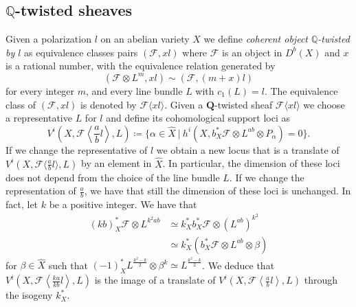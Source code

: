 \documentclass[11pt,letter]{amsart}
\numberwithin{equation}{section}
\begin{document}
\subsection{$\mathbb{Q}$-twisted sheaves}\label{sec2.2}
Given a polarization $l$ on an abelian variety $X$ we define \emph{coherent object $\mathbb{Q}$-twisted by $l$} as equivalence classes pairs $(\mathcal{F}, xl)$ where $\mathcal{F}$ is an object in $D^b(X)$ and $x$ is a rational number, with the equivalence relation generated by
$$
(\mathcal{F}\otimes L^m,xl)\sim(\mathcal{F},(m+x)l)
$$
for every integer $m$, and every line bundle $L$ with $c_1(L)=l$. The equivalence class of $(\mathcal{F},xl)$ is denoted by $\mathcal{F}\langle xl\rangle$. Given a $\mathbf{Q}$-twisted sheaf $\mathcal{F}\langle xl\rangle$ we choose a representative $L$ for $l$ and define its cohomological support loci as
$$
V^i\left(X, \mathcal{F}\left\langle \frac{a}{b}l\right\rangle, L\right)\coloneqq\{  \alpha\in\hat{X}\:|\:h^i(X, b_X^*\mathcal{F}\otimes L^{ab}\otimes P_  \alpha)=0\}.
$$
If we change the representative of $l$ we obtain a new locus that is a translate of $V^i\left(X, \mathcal{F}\langle \frac{a}{b}l\rangle, L\right)$ by an element in $\hat{X}$. In particular, the dimension of these loci does not depend from the choice of the line bundle $L$.
If we change the representation of $\frac{a}{b}$, we have that still the dimension of these loci is unchanged.
 In fact, let $k$ be a positive integer. We have that 
 \begin{align*}
  (k b)_X^*\mathcal{F}\otimes L^{k^2ab} &\simeq   k_X^*b_X^* \mathcal{F}\otimes\left( L^{ab}\right)^{k^2}\\
  &\simeq k_X^*\left(b_X^* \mathcal{F}\otimes L^{ab}\otimes\beta\right)
 \end{align*}
 for $\beta\in\hat{X}$ such that $(-1)_X^*L^{\frac{k^2-k}{2}}\otimes\beta^k \simeq L^{\frac{k^2-k}{2}}$. We deduce that $V^i\left(X, \mathcal{F}\left\langle \frac{ka}{kb}l\right\rangle, L\right)$ is the image of a translate of $V^i\left(X, \mathcal{F}\left\langle \frac{a}{b}l\right\rangle, L\right)$ through the isogeny $k_X^*$.\par
 
\end{document}
